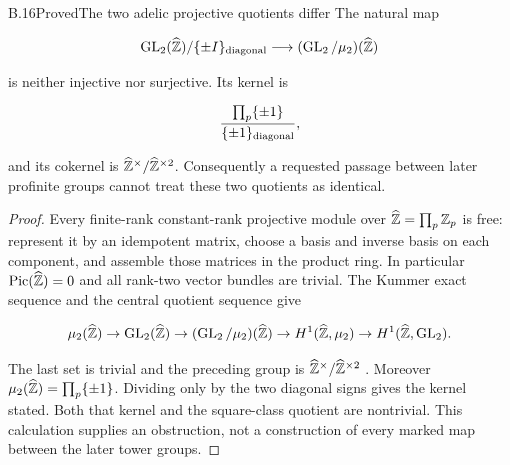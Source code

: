\begin{statement}{B.16}{Proved}{The two adelic projective quotients differ}
The natural map

$$
\operatorname{GL}_2(\widehat{\mathbb Z})/\{\pm I\}_{\rm diagonal}
 \longrightarrow(\operatorname{GL}_2/\mu_2)(\widehat{\mathbb Z})
$$

is neither injective nor surjective. Its kernel is

$$
\frac{\prod_p\{\pm1\}}{\{\pm1\}_{\rm diagonal}},
$$

and its cokernel is
$\widehat{\mathbb Z}^\times/\widehat{\mathbb Z}^{\times2}$.
Consequently a requested passage between later profinite groups
cannot treat these two quotients as identical.
\end{statement}
\begin{proof}
Every finite-rank constant-rank projective module over
$\widehat{\mathbb Z}=\prod_p\mathbb Z_p$ is free: represent it by an idempotent
matrix, choose a basis and inverse basis on each component,
and assemble those matrices in the product ring.
In particular $\operatorname{Pic}(\widehat{\mathbb Z})=0$ and all
rank-two vector bundles are trivial.
The Kummer exact sequence and the central quotient sequence give

$$
\mu_2(\widehat{\mathbb Z})\to\operatorname{GL}_2(\widehat{\mathbb Z})
 \to(\operatorname{GL}_2/\mu_2)(\widehat{\mathbb Z})
 \to H^1(\widehat{\mathbb Z},\mu_2)\to H^1(\widehat{\mathbb Z},\operatorname{GL}_2).
$$

The last set is trivial and the preceding group is
$\widehat{\mathbb Z}^\times/\widehat{\mathbb Z}^{\times2}$
\cite[Lemma59.28.3]{AB_Stacks}.
Moreover $\mu_2(\widehat{\mathbb Z})=\prod_p\{\pm1\}$.
Dividing only by the two diagonal signs gives the kernel stated.
Both that kernel and the square-class quotient are nontrivial.
This calculation supplies an obstruction, not a construction
of every marked map between the later tower groups.
\end{proof}

